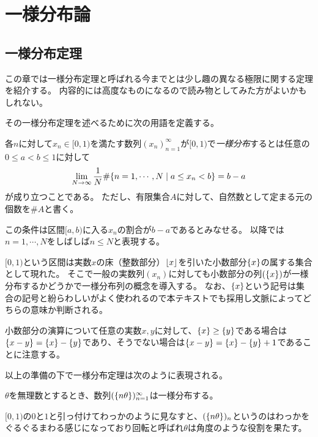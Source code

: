 
\chapter{一様分布論}

\section{一様分布定理}

この章では一様分布定理と呼ばれる今までとは少し趣の異なる極限に関する定理を紹介する。
内容的には高度なものになるので読み物としてみた方がよいかもしれない。

その一様分布定理を述べるために次の用語を定義する。

\begin{definition}[一様分布列]
各$n$に対して$x_n \in [0, 1)$を満たす数列$(x_n)_{n = 1}^\infty$が$[0, 1)$で\emph{一様分布}するとは任意の$0 \le a < b \le 1$に対して
$$
\lim_{N \to \infty}\frac{1}{N}\#\{ n = 1, \cdots, N \mid a \le x_n < b \} = b-a
$$
が成り立つことである。
ただし、有限集合$A$に対して、自然数として定まる元の個数を$\# A$と書く。
\end{definition}

この条件は区間$[a, b)$に入る$x_n$の割合が$b-a$であるとみなせる。
以降では$n = 1, \cdots, N$をしばしば$n \le N$と表現する。

$[0, 1)$という区間は実数$x$の床（整数部分）$\lfloor x\rfloor$を引いた小数部分$\{x\}$の属する集合として現れた。
そこで一般の実数列$(x_n)$に対しても小数部分の列$(\{x\})$が一様分布するかどうかで一様分布列の概念を導入する。
なお、$\{x\}$という記号は集合の記号と紛らわしいがよく使われるので本テキストでも採用し文脈によってどちらの意味か判断される。

\begin{remark}
小数部分の演算について任意の実数$x, y$に対して、$\{x\} \ge \{y\}$である場合は$\{x-y\} = \{x\}-\{y\}$であり、そうでない場合は$\{x-y\} = \{x\}-\{y\}+1$であることに注意する。
\end{remark}

以上の準備の下で一様分布定理は次のように表現される。

\begin{theorem}[一様分布定理]
$\theta$を無理数とするとき、数列$(\{n\theta\})_{n = 1}^\infty$は一様分布する。
\end{theorem}

$[0, 1)$の$0$と$1$と引っ付けてわっかのように見なすと、$(\{n\theta\})_n$というのはわっかをぐるぐるまわる感じになっており回転と呼ばれ$\theta$は角度のような役割を果たす。

